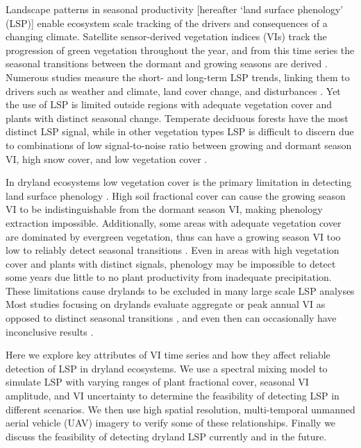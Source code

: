 \documentclass{article}
\begin{document}
Landscape patterns in seasonal productivity [hereafter ‘land surface phenology’ (LSP)] enable ecosystem scale tracking of the drivers and consequences of a changing climate. Satellite sensor-derived vegetation indices (VIs) track the progression of green vegetation throughout the year, and from this time series the seasonal transitions between the dormant and growing seasons are derived \cite{zhang-liu2018, friedl2006, jonsson2004, sakamoto2010, gao2017, gray2019, bolton2020, zeng-wardlow2020}. Numerous studies measure the short- and long-term LSP trends, linking them to drivers such as weather and climate, land cover change, and disturbances \cite{piao-wang2020}. Yet the use of LSP is limited outside regions with adequate vegetation cover and plants with distinct seasonal change. Temperate deciduous forests have the most distinct LSP signal, while in other vegetation types LSP is difficult to discern due to combinations of low signal-to-noise ratio between growing and dormant season VI, high snow cover, and low vegetation cover \cite{richardson2018b, white2009}. 

In dryland ecosystems low vegetation cover is the primary limitation in detecting land surface phenology \cite{ma2013}. High soil fractional cover can cause the growing season VI to be indistinguishable from the dormant season VI, making phenology extraction impossible. Additionally, some areas with adequate vegetation cover are dominated by evergreen vegetation, thus can have a growing season VI too low to reliably detect seasonal transitions \cite{walker2015}. Even in areas with high vegetation cover and plants with distinct signals, phenology may be impossible to detect some years due little to no plant productivity from inadequate precipitation. These limitations cause drylands to be excluded in many large scale LSP analyses \cite{jeong2011, zhu2012, shen-zhang2014, xin-broich2015, garonna2016} Most studies focusing on drylands evaluate aggregate or peak annual VI as opposed to distinct seasonal transitions \cite{walker2015, hou-du2019}, and even then can occasionally have inconclusive results \cite{fensholt2012, andela2013}.

Here we explore key attributes of VI time series and how they affect reliable detection of LSP in dryland ecosystems. We use a spectral mixing model to simulate LSP with varying ranges of plant fractional cover, seasonal VI amplitude, and VI uncertainty to determine the feasibility of detecting LSP in different scenarios. We then use high spatial resolution, multi-temporal unmanned aerial vehicle (UAV) imagery to verify some of these relationships. Finally we discuss the feasibility of detecting dryland LSP currently and in the future. 
\end{document}
